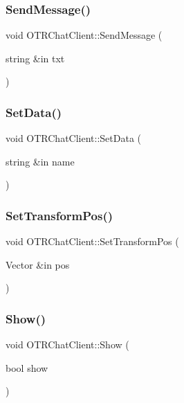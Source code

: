 \hypertarget{class_o_t_r_chat_client_aee69b7bfe4d463463d3cae040228728a}{}\label{class_o_t_r_chat_client_aee69b7bfe4d463463d3cae040228728a} 
\subsubsection{\texorpdfstring{Send\+Message()}{SendMessage()}}
{\footnotesize\ttfamily void O\+T\+R\+Chat\+Client\+::\+Send\+Message (\begin{DoxyParamCaption}\item[{string \&in}]{txt }\end{DoxyParamCaption})}

\hypertarget{class_o_t_r_chat_client_a329bd6c762a7359c5dd09a5315263044}{}\label{class_o_t_r_chat_client_a329bd6c762a7359c5dd09a5315263044} 
\subsubsection{\texorpdfstring{Set\+Data()}{SetData()}}
{\footnotesize\ttfamily void O\+T\+R\+Chat\+Client\+::\+Set\+Data (\begin{DoxyParamCaption}\item[{string \&in}]{name }\end{DoxyParamCaption})}

\hypertarget{class_o_t_r_chat_client_ae4bc4b470f3881b7a6b52a109b2934ea}{}\label{class_o_t_r_chat_client_ae4bc4b470f3881b7a6b52a109b2934ea} 
\subsubsection{\texorpdfstring{Set\+Transform\+Pos()}{SetTransformPos()}}
{\footnotesize\ttfamily void O\+T\+R\+Chat\+Client\+::\+Set\+Transform\+Pos (\begin{DoxyParamCaption}\item[{Vector \&in}]{pos }\end{DoxyParamCaption})}

\hypertarget{class_o_t_r_chat_client_a03053ab6ffa2b27a311ddb646e7ffa7e}{}\label{class_o_t_r_chat_client_a03053ab6ffa2b27a311ddb646e7ffa7e} 
\subsubsection{\texorpdfstring{Show()}{Show()}}
{\footnotesize\ttfamily void O\+T\+R\+Chat\+Client\+::\+Show (\begin{DoxyParamCaption}\item[{bool}]{show }\end{DoxyParamCaption})}

